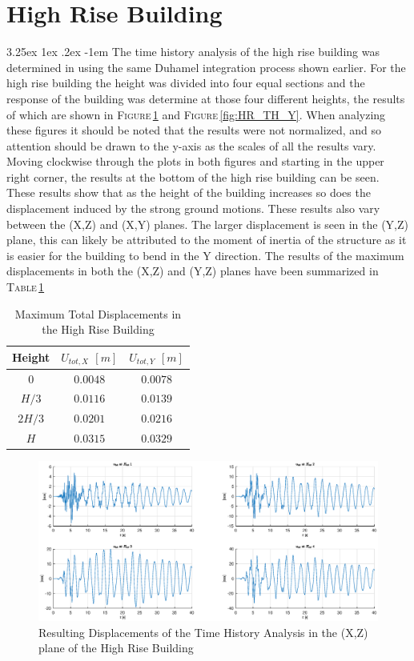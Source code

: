 \documentclass[11pt,a4paper,titlepage]{report}
\makeatletter
\renewcommand\paragraph{\@startsection{paragraph}{5}{\z@}%
  {3.25ex \@plus1ex \@minus.2ex}%
  {-1em}%
  {\normalfont\normalsize\bfseries}}
\makeatother
\begin{document}
\section{High Rise Building}
\paragraph{}The time history analysis of the high rise building was determined in using the same Duhamel integration process shown earlier. For the high rise building the height was divided into four equal sections and the response of the building was determine at those four different heights, the results of which are shown in \textsc{Figure}\,\ref{fig:HR_TH_X} and \textsc{Figure}\,\ref{fig:HR_TH_Y}. When analyzing these figures it should be noted that the results were not normalized, and so attention should be drawn to the y-axis as the scales of all the results vary. Moving clockwise through the plots in both figures and starting in the upper right corner, the results at the bottom of the high rise building can be seen. These results show that as the height of the building increases so does the displacement induced by the strong ground motions. These results also vary between the (X,Z) and (X,Y) planes. The larger displacement is seen in the (Y,Z) plane, this can likely be attributed to the moment of inertia of the structure as it is easier for the building to bend in the Y direction. The results of the maximum displacements in both the (X,Z) and (Y,Z) planes have been summarized in \textsc{Table}\,\ref{tab:maximum total displacement HR TH}
\begin{table}[h]
    \centering
    \begin{tabular}{c|c|c}
    Height &    $U_{tot,X}$ $[m]$ & $U_{tot,Y}$ $[m]$\\
         \hline
     $0$ &  $0.0048$ & $0.0078$\\
      $H/3$ & $0.0116$ & $0.0139$\\
      $2H/3$ &  $0.0201$ & $0.0216$\\
      $H$ &  $0.0315$ & $0.0329$\\
    \end{tabular}
    \caption{Maximum Total Displacements in the High Rise Building}
    \label{tab:maximum total displacement HR TH}
\end{table}
\begin{figure} [h]
    \centering
    \includegraphics[width=16cm]{HR_TH_X.eps}
    \caption{Resulting Displacements of the Time History Analysis in the (X,Z) plane of the High Rise Building}
    \label{fig:HR_TH_X}
\end{figure}
\end{document}
